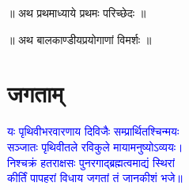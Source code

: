 \vspace{4mm}
{}
\centering ॥ अथ प्रथमाध्याये प्रथमः परिच्छेदः ॥\nopagebreak\\
\vspace{4mm}
{}
\centering ॥ अथ बालकाण्डीयप्रयोगाणां विमर्शः ॥\nopagebreak\\
\section[जगताम्]{जगताम्‌}
\centering\textcolor{blue}{यः पृथिवीभरवारणाय दिविजैः सम्प्रार्थितश्चिन्मयः\nopagebreak\\
सञ्जातः पृथिवीतले रविकुले मायामनुष्योऽव्ययः।\nopagebreak\\
निश्चक्रं हतराक्षसः पुनरगाद्ब्रह्मत्वमाद्यं स्थिरां\nopagebreak\\
कीर्तिं पापहरां विधाय जगतां तं जानकीशं भजे॥}\nopagebreak\\
\\
